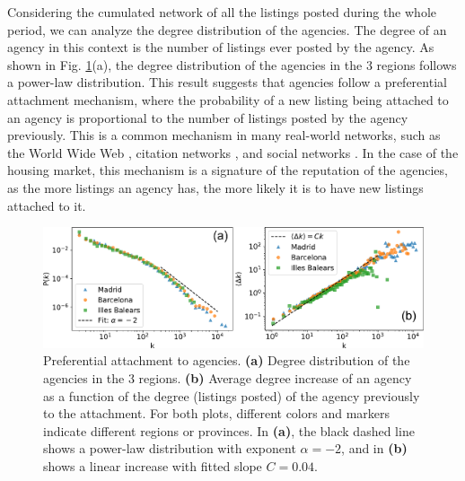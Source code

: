 Considering the cumulated network of all the listings posted during the whole period, we can analyze the degree distribution of the agencies. The degree of an agency in this context is the number of listings ever posted by the agency. As shown in Fig. \ref{fig:panel_degree}(a), the degree distribution of the agencies in the 3 regions follows a power-law distribution. This result suggests that agencies follow a preferential attachment mechanism, where the probability of a new listing being attached to an agency is proportional to the number of listings posted by the agency previously. This is a common mechanism in many real-world networks, such as the World Wide Web \cite{barabasi1999emergence}, citation networks \cite{redner1998popular}, and social networks \cite{barabasi1999emergence}. In the case of the housing market, this mechanism is a signature of the reputation of the agencies, as the more listings an agency has, the more likely it is to have new listings attached to it.

\begin{figure}
    \centering
    \includegraphics[width =\textwidth]{Figs/Idealista_dynamics/panel_degree.pdf}
	\caption[Preferential attachment to agencies.]{Preferential attachment to agencies. \textbf{(a)} Degree distribution of the agencies in the 3 regions. \textbf{(b)} Average degree increase of an agency as a function of the degree (listings posted) of the agency previously to the attachment. For both plots, different colors and markers indicate different regions or provinces. In \textbf{(a)}, the black dashed line shows a power-law distribution with exponent $\alpha  =-2$, and in \textbf{(b)} shows a linear increase with fitted slope $C = 0.04$. \label{fig:panel_degree}}
\end{figure}


